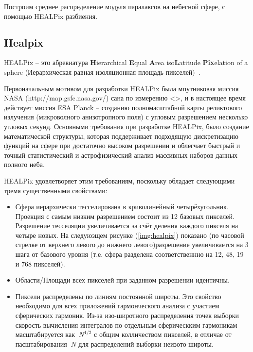 \documentclass[14pt]{article} %
\begin{document}
Построим среднее распределение модуля паралаксов на небесной сфере, с помощью HEALPix разбиения.

\subsection{Healpix}\label{sub:smthhealpix}
HEALPix -- это абревиатура \textbf{H}ierarchical \textbf{E}qual \textbf{A}rea iso\textbf{L}atitude \textbf{Pix}elation of a sphere (Иерархическая равная изоляционная площадь пикселей)~\cite{wiki:healpix}.

Первоначальным мотивом для разработки HEALPix была мпутниковая миссия NASA (http://map.gsfc.nasa.gov/) сана по измерению <>, и в настоящее время действует миссия ESA Planck -- созданию полномасштабной карты реликтового излучения (микроволного анизотропного поля) с угловым разрешением несколько угловых секунд. Основными требования при разработке HEALPix, было создание математической структуры, которая поддерживает подходящую дискретизацию функций на сфере при достаточно высоком разрешении и облегчает быстрый и точный статистический и астрофизический анализ массивных наборов данных полного неба.

HEALPix удовлетворяет этим требованиям, поскольку обладает следующими тремя существенными свойствами:

\begin{itemize}
\item Сфера иерархически тесселирована в криволинейный четырёхугольник. Проекция с самым низким разрешением состоит из 12 базовых пикселей. Разрешение тесселяции увеличивается за счёт деления каждого пикселя на четыре новых. На следуюзщем рисунке (\ref{img:healpix}) показано (по часовой стрелке от верхнего левого до нижнего левого)разрешение увеличивается на 3 шага от базового уровня (т.е. сфера разделена соответственнно на 12, 48, 19 и 768 пикселей).
\item Области/Площади всех пикселей при заданном разрешении идентичны.
\item Пиксели распределены по линиям постоянной широты. Это свойство необходимо для всех приложений гармонческого анализа с участием сферических гармоник. Из-за изо-широтного распределения точек выборки скорость вычисления интегралов по отдельным сферическким гармоникам масштабируется как $~N^{1/2}$ с общим колличеством пикселей, в отличае от пасштабирования $~N$ для распределений выборки неизото-широты.
\end{itemize}
\end{document}
